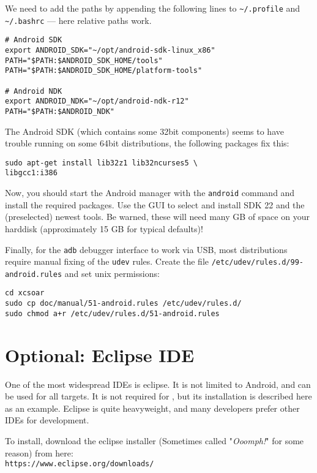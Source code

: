 We need to add the paths by appending the following lines to \texttt{\textasciitilde/.profile} and \texttt{\textasciitilde/.bashrc} --- here relative paths work.

\begin{verbatim}
# Android SDK
export ANDROID_SDK="~/opt/android-sdk-linux_x86"
PATH="$PATH:$ANDROID_SDK_HOME/tools"
PATH="$PATH:$ANDROID_SDK_HOME/platform-tools"

# Android NDK
export ANDROID_NDK="~/opt/android-ndk-r12"
PATH="$PATH:$ANDROID_NDK"
\end{verbatim}

The Android SDK (which contains some 32bit components) seems to have trouble running on some 64bit distributions, the following packages fix this:

\begin{verbatim}
sudo apt-get install lib32z1 lib32ncurses5 \
libgcc1:i386
\end{verbatim}

Now, you should start the Android manager with the \texttt{android} command and install the required packages.
Use the GUI to select and install SDK 22 and the (preselected) newest tools.
Be warned, these will need many GB of space on your harddisk (approximately 15 GB for typical defaults)!

Finally, for the \texttt{adb} debugger interface to work via USB, most distributions require manual fixing of the \texttt{udev} rules.
Create the file \texttt{/etc/udev/rules.d/99-android.rules} and set unix permissions:

\begin{verbatim}
cd xcsoar
sudo cp doc/manual/51-android.rules /etc/udev/rules.d/
sudo chmod a+r /etc/udev/rules.d/51-android.rules
\end{verbatim}

\section{Optional: Eclipse IDE}
One of the most widespread IDEs is eclipse. It is not limited to Android, and can be used for all targets. It is not required for \xc, but its installation is described here as an example. Eclipse is quite heavyweight, and many developers prefer other IDEs for \xc development.

To install, download the eclipse installer (Sometimes called "\emph{Ooomph!}" for some reason) from here:\\
\texttt{https://www.eclipse.org/downloads/}

